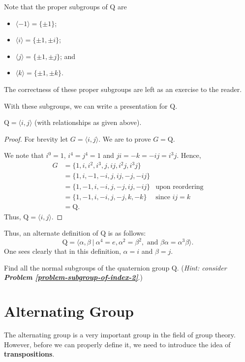 Note that the proper subgroups of $\mathrm{Q}$ are
\begin{itemize}
    \item $\langle -1 \rangle = \{\pm1\}$;
    \item $\langle i \rangle = \{\pm1, \pm i\}$;
    \item $\langle j \rangle = \{\pm1, \pm j\}$; and
    \item $\langle k \rangle = \{\pm1, \pm k\}$.
\end{itemize}
The correctness of these proper subgroups are left as an exercise to the reader.

With these subgroups, we can write a presentation for $\mathrm{Q}$.

\begin{proposition}
    $\mathrm{Q} = \langle i, j \rangle$ (with relationships as given above).
\end{proposition}
\begin{proof}
    For brevity let $G = \langle i, j \rangle$. We are to prove $G = \mathrm{Q}$.

    We note that $i^0 = 1$, $i^4 = j^4 = 1$ and $ji = -k = -ij = i^3j$. Hence,
    \begin{align*}
        G &= \{1, i, i^2, i^3, j, ij, i^2j, i^3j\}\\
        &= \{1, i, -1, -i, j, ij, -j, -ij\}\\
        &= \{1, -1, i, -i, j, -j, ij, -ij\} & \text{upon reordering}\\
        &= \{1, -1, i, -i, j, -j, k, -k\} & \text{since } ij = k\\
        &= \mathrm{Q}.
    \end{align*}
    Thus, $\mathrm{Q} = \langle i, j \rangle$.
\end{proof}

Thus, an alternate definition of $\mathrm{Q}$ is as follows:
\[
    \mathrm{Q} = \langle \alpha, \beta \ | \ \alpha^4 = e, \alpha^2 = \beta^2, \text{ and } \beta\alpha = \alpha^3\beta \rangle.
\]
One sees clearly that in this definition, $\alpha = i$ and $\beta = j$.

\begin{exercise}\label{exercise-normal-subgroups-of-quarternion-group}
    Find all the normal subgroups of the quaternion group $\mathrm{Q}$.\newline
    (\textit{Hint: consider \textbf{Problem \ref{problem-subgroup-of-index-2}}}.)
\end{exercise}

\section{Alternating Group}
The alternating group is a very important group in the field of group theory. However, before we can properly define it, we need to introduce the idea of \textbf{transpositions}.

